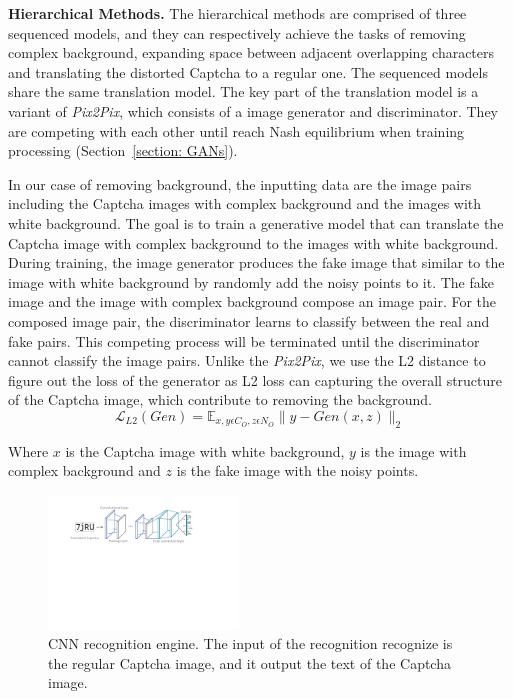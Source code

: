 \noindent \textbf{Hierarchical Methods.} The hierarchical methods are comprised of three sequenced models, and they can respectively achieve the tasks of removing complex background, expanding space between adjacent overlapping characters and translating the distorted Captcha to a regular one. The sequenced models share the same translation model.
The key part of the translation model is a variant of \emph{Pix2Pix}, which consists of a image generator and discriminator. They are competing with each other until reach Nash equilibrium when training processing (Section~\ref{section: GANs}).

In our case of removing background, the inputting data are the image pairs including the Captcha images with complex background and the images with white background.
The goal is to train a generative model that can translate the Captcha image with complex background to the images with white background.
During training, the image generator produces the fake image that similar to the image with white background by randomly add the noisy points to it. The fake image and the image with complex background compose an image pair.
For the composed image pair, the discriminator learns to classify between the real and fake pairs. This competing process will be terminated until the discriminator cannot classify the image pairs.
Unlike the \emph{Pix2Pix}, we use the L2 distance to figure out the loss of the generator as L2 loss can capturing the overall structure of the Captcha image, which contribute to removing the background.
\begin{equation}\label{equation: L2_loss}
    \mathcal{L}_{L2}(Gen) = \mathbb{E}_{x,y \epsilon C_{O}, z \epsilon N_{O}} \|y - Gen(x, z)\|_{2}
\end{equation}

Where $x$ is the Captcha image with white background, $y$ is the image with complex background and $z$ is the fake image with the noisy points.

\begin{figure}[!t]
  \centering
  \includegraphics[width=0.45\textwidth]{fig/cnn_model.pdf}
  \caption{CNN recognition engine. The input of the recognition recognize is the regular Captcha image, and it output the text of the Captcha image.}
  \label{fig: cnn_model}
\end{figure}

